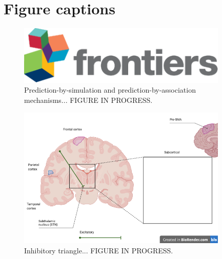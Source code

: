 \documentclass[utf8]{template/frontiersSCNS} %
\begin{document}

\section*{Figure captions}


\begin{figure}[ht] %
\begin{center}
\includegraphics[width=10cm]{figures/logo1} %
\end{center}
\caption{Prediction-by-simulation and prediction-by-association mechanisms... FIGURE IN PROGRESS.}\label{fig:1}
\end{figure}

\begin{figure}[ht] %
\begin{center}
\includegraphics[width=10cm]{figures/inhibitory_triangle.png} %
\end{center}
\caption{Inhibitory triangle... FIGURE IN PROGRESS.}\label{fig:2}
\end{figure}
\end{document}
